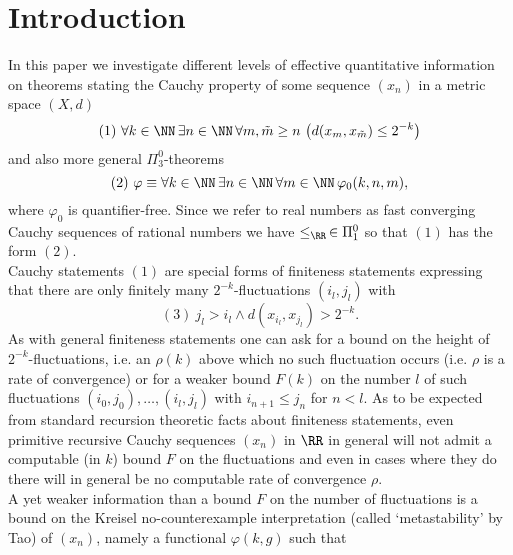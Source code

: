 \section{Introduction}

\newtheorem{definition}{Definition}[section]
\newtheorem{proposition}[definition]{Proposition}
\newtheorem{theorem}[definition]{Theorem}
\newtheorem{corollary}[definition]{Corollary}
\newtheorem{exercise}[definition]{Exercise}
\newtheorem{clm}[definition]{Claim}
\newtheorem{example}[definition]{Example}
\newtheorem{notation}[definition]{Notation}
\newtheorem{application}[definition]{Application} 


In this paper we investigate different levels of effective quantitative 
information on theorems stating the Cauchy property of some sequence 
$(x_n)$ in a metric space $(X,d)$
\[ (1) \ \forall k\in\NN\,\exists n\in\NN\,\forall m,\tilde{m}\ge n
\ \big( d(x_m,
x_{\tilde{m}})\le 2^{-k}\big) \] 
and also more general $\Pi^0_3$-theorems  
\[ (2) \ \varphi\equiv 
\forall k\in\NN\,\exists n\in\NN\,
\forall m\in\NN\,\varphi_0(k,n,m),\] where $\varphi_0$ is quantifier-free. 
Since we refer to real numbers as fast 
converging Cauchy sequences of rational numbers we have $\le_{\RR}\,\in\Pi^0_1$ 
so that $(1)$ has the form $(2).$
\\[2mm] 
Cauchy statements $(1)$ are special forms of finiteness statements expressing 
that there are only finitely many $2^{-k}$-fluctuations $(i_l,j_l)$ 
with 
\[ (3) \ j_l>i_l\wedge d(x_{i_l},x_{j_l})>2^{-k}. \] 
As with general finiteness statements one can ask for a bound on the height 
of $2^{-k}$-fluctuations, i.e. an $\rho(k)$ above which no such fluctuation 
occurs (i.e. $\rho$ is a rate of convergence) 
or for a weaker bound $F(k)$ on the number $l$ 
of such fluctuations $(i_0,j_0),\ldots,(i_l,j_l)$ with $i_{n+1}\le j_{n}$ 
for $n<l.$ 
As to be expected from standard recursion theoretic facts about finiteness 
statements, even primitive recursive Cauchy sequences $(x_n)$ in $\RR$ 
in general will not admit a computable (in $k$) bound $F$ on the fluctuations 
and even in cases where they do there will in general be no computable 
rate of convergence $\rho.$\\[2mm] 
A yet weaker information than a bound $F$ on the number of fluctuations is 
a bound on the Kreisel no-counterexample 
interpretation (called `metastability' by Tao) of $(x_n)$, namely a functional 
$\varphi(k,g)$ such that 
